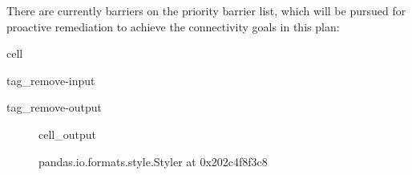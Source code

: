 \documentclass[letterpaper,10pt,english]{jupyterBook}
\begin{document}
\sphinxAtStartPar
There are currently  barriers on the priority barrier list, which will be pursued for proactive remediation to achieve the connectivity goals in this plan:

\begin{sphinxuseclass}{cell}
\begin{sphinxuseclass}{tag_remove-input}
\begin{sphinxuseclass}{tag_remove-output}
\end{sphinxuseclass}
\end{sphinxuseclass}
\end{sphinxuseclass}
\begin{figure}[htbp]
\centering
\capstart
\begin{sphinxVerbatimOutput}

\begin{sphinxuseclass}{cell_output}
\begin{sphinxVerbatim}[commandchars=\\\{\}]
\PYGZlt{}pandas.io.formats.style.Styler at 0x202c4f8f3c8\PYGZgt{}
\end{sphinxVerbatim}

\end{sphinxuseclass}\end{sphinxVerbatimOutput}
\caption{}\label{\detokenize{AppendixB:table21}}\end{figure}
\end{document}
